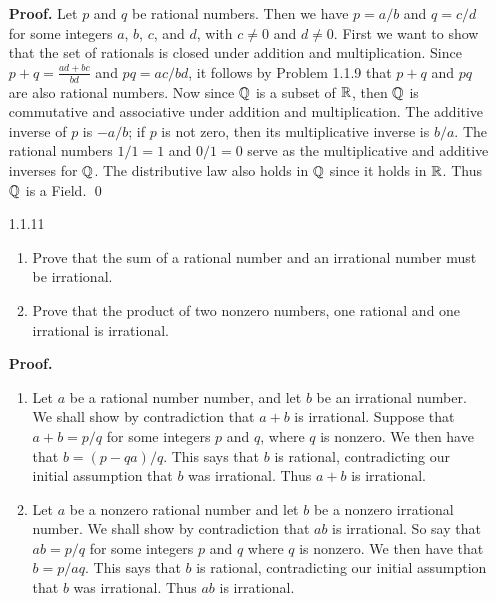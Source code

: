 \begin{enumerate}
      \textbf{Proof.} Let $p$ and $q$ be rational numbers. Then we have
      $p = a/b$ and $q = c/d$ for some integers $a$, $b$, $c$, and $d$, with
      $c \neq 0$ and $d \neq 0$. First we want to show that the set of rationals
      is closed under addition and multiplication. Since
      $\displaystyle p + q = \frac{ad + bc}{bd}$ and $pq= ac/bd$, it follows by
      Problem 1.1.9 that $p + q$ and $pq$ are also rational numbers. Now since
      $\mathbb{Q}$ is a subset of $\mathbb{R}$, then $\mathbb{Q}$ is commutative and associative under 
      addition and multiplication. The additive inverse of $p$ is $-a/b$; if $p$
      is not zero, then its multiplicative inverse is $b / a$. The rational
      numbers $1/1 = 1$ and $0/1 = 0$ serve as the multiplicative and additive
      inverses for $\mathbb{Q}$. The distributive law also holds in $\mathbb{Q}$ since it holds
      in $\mathbb{R}$. Thus $\mathbb{Q}$ is a Field. \qed
   \item[1.1.11]
                  \begin{enumerate}
                     \item Prove that the sum of a rational number and an 
                           irrational number must be irrational.
                     \item Prove that the product of two nonzero numbers, one 
                           rational and one irrational is irrational.
                  \end{enumerate}
      
      \textbf{Proof.}
      
      \begin{enumerate}
         \item Let $a$ be a rational number number, and let $b$ be an irrational
               number. We shall show by contradiction that $a + b$ is
               irrational. Suppose that $a + b = p/q$ for some integers $p$ and
               $q$, where $q$ is nonzero. We then have that $b = (p - qa)/q$.
               This says that $b$ is rational, contradicting our initial
               assumption that $b$ was irrational. Thus $a + b$ is irrational.
         \item Let $a$ be a nonzero rational number and let $b$ be a nonzero
               irrational number. We shall show by contradiction that $ab$ is
               irrational. So say that $ab = p/q$ for some integers $p$ and $q$
               where $q$ is nonzero. We then have that $b = p/aq$. This says
               that $b$ is rational, contradicting our initial assumption that
               $b$ was irrational. Thus $ab$ is irrational.
      \end{enumerate}
      

\end{enumerate}
